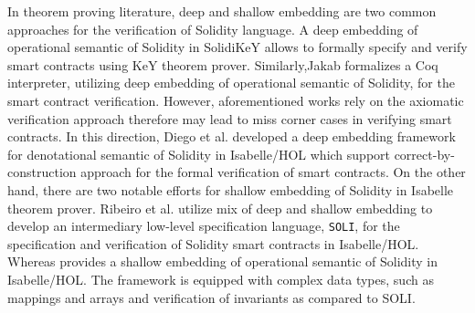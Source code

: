 \documentclass[a4paper,UKenglish,cleveref, autoref, thm-restate]{oasics-v2021}
\begin{document}
In theorem proving literature, deep and shallow embedding are two common approaches for the verification of Solidity language. A deep embedding of operational semantic of Solidity in SolidiKeY \cite{ahrendt2020functional} allows to formally specify and verify smart contracts using KeY theorem prover. Similarly,Jakab \cite{zakrzewski2018towards} formalizes a Coq interpreter, utilizing deep embedding of operational semantic of Solidity, for the smart contract verification. However, aforementioned works rely on the axiomatic verification approach therefore may lead to miss corner cases in verifying smart contracts. In this direction, Diego et al. \cite{marmsoler2022isabelle}  developed a deep embedding framework for denotational semantic of Solidity in Isabelle/HOL which support correct-by-construction approach for the formal verification of smart contracts. On the other hand, there are two notable efforts for shallow embedding of Solidity in Isabelle theorem prover. Ribeiro et al. \cite{ribeiro2020formal} utilize mix of deep and shallow embedding to develop an intermediary low-level specification language, \texttt{SOLI}, for the specification and verification of Solidity smart contracts in Isabelle/HOL. Whereas \cite{marmsoler2024secure} provides a shallow embedding of operational semantic of Solidity in Isabelle/HOL. The framework is equipped with complex data types, such as mappings and arrays and verification of invariants as compared to SOLI.
\end{document}

